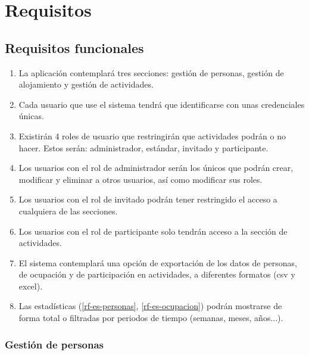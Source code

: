 
\section{Requisitos}

\subsection{Requisitos funcionales}

\begin{enumerate}[start=1,label={RF-\arabic*.}]

    \item La aplicación contemplará tres secciones: gestión de personas, gestión de alojamiento y gestión de actividades.
    \item Cada usuario que use el sistema tendrá que identificarse con unas credenciales únicas.
    \item Existirán 4 roles de usuario que restringirán que actividades podrán o no hacer. Estos serán: administrador, estándar, invitado y participante.
    \item Los usuarios con el rol de administrador serán los únicos que podrán crear, modificar y eliminar a otros usuarios, así como modificar sus roles.
    \item Los usuarios con el rol de invitado podrán tener restringido el acceso a cualquiera de las secciones.
    \item Los usuarios con el rol de participante solo tendrán acceso a la sección de actividades.
    \item El sistema contemplará una opción de exportación de los datos de personas, de ocupación y de participación en actividades, a diferentes formatos (csv y excel).
    \item Las estadísticas (\ref{rf-es-personas}, \ref{rf-es-ocupacion}) podrán mostrarse de forma total o filtradas por periodos de tiempo (semanas, meses, años...).

\end{enumerate}

\subsubsection{Gestión de personas}

